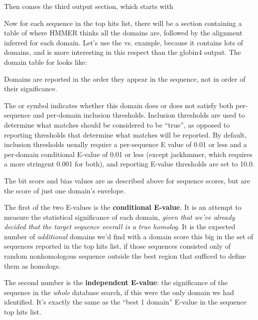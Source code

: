 Then comes the third output section, which starts with


Now for each sequence in the top hits list, there will be a section 
containing a table of where HMMER thinks all the domains are,
followed by the alignment inferred for each domain. Let's use the
 vs.  example, because it contains lots
of domains, and is more interesting in this respect than the globin4
output.  The domain table for  looks like:


Domains are reported in the order they appear in the sequence, not in
order of their significance.

The \mono{!} or  symbol indicates whether this domain does or
does not satisfy both per-sequence and per-domain inclusion
thresholds. Inclusion thresholds are used to determine what matches
should be considered to be ``true'', as opposed to reporting
thresholds that determine what matches will be reported. By default, inclusion thresholds usually require a
per-sequence E value of 0.01 or less and a per-domain conditional
E-value of 0.01 or less (except jackhmmer, which requires a more
stringent 0.001 for both), and reporting E-value thresholds are set to
10.0.

The bit score and bias values are as described above for sequence
scores, but are the score of just one domain's envelope. 

The first of the two E-values is the \textbf{conditional
  E-value}. It is an attempt to
measure the statistical significance of each domain, \emph{given that
  we've already decided that the target sequence overall is a true
  homolog}.  It is the expected number of \emph{additional} domains
we'd find with a domain score this big in the set of sequences
reported in the top hits list, if those sequences consisted only of
random nonhomologous sequence outside the best region that sufficed to
define them as homologs.

The second number is the \textbf{independent E-value}: the
significance of the sequence in the \emph{whole} database search, if
this were the only domain we had identified. It's exactly the same as
the ``best 1 domain'' E-value in the sequence top hits list.

